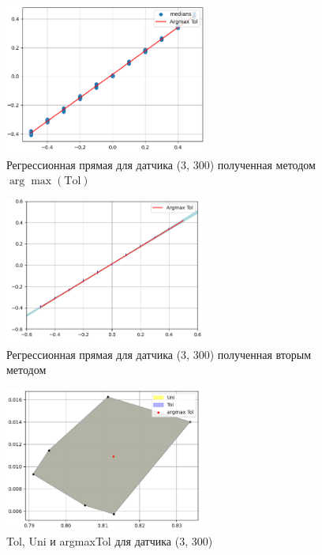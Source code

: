 \documentclass[a4paper,14pt]{extarticle}
\begin{document}
\begin{figure}[htbp]
    \centering
    \includegraphics[width=0.6\textwidth]{f4.png}
    \caption{Регрессионная прямая для датчика (3, 300) полученная методом $\arg\max(\text{Tol})$}
    \label{fig:hamiltonianGraph}
\end{figure}
\clearpage
\begin{figure}[htbp]
    \centering
    \includegraphics[width=0.6\textwidth]{f5.png}
    \caption{Регрессионная прямая для датчика (3, 300) полученная вторым методом}
    \label{fig:hamiltonianGraph}
\end{figure}

\begin{figure}[htbp]
    \centering
    \includegraphics[width=0.6\textwidth]{f6.png}
    \caption{Tol, Uni и argmaxTol для датчика (3, 300)}
    \label{fig:hamiltonianGraph}
\end{figure}
\clearpage
\end{document}
